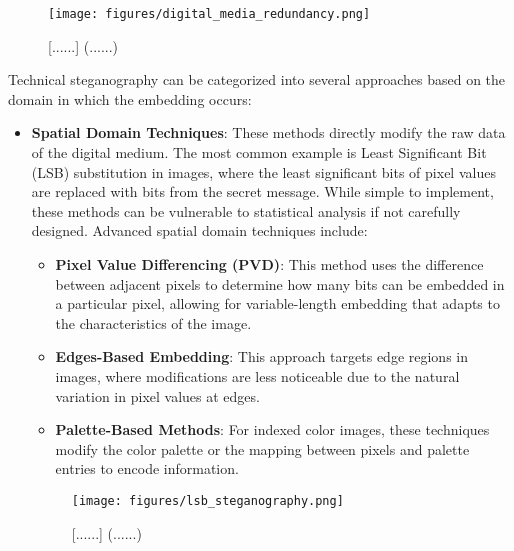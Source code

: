 \documentclass[12pt, a4paper, oneside]{book}
\begin{document}
\begin{figure}[htbp]
    \centering
    \texttt{[image: figures/digital\_media\_redundancy.png]}
    \caption{[......] (......)}
    \label{fig:digital_redundancy}
\end{figure}

Technical steganography can be categorized into several approaches based on the domain in which the embedding occurs:

\begin{itemize}[leftmargin=*]
    \item \textbf{Spatial Domain Techniques}: These methods directly modify the raw data of the digital medium. The most common example is Least Significant Bit (LSB) substitution in images, where the least significant bits of pixel values are replaced with bits from the secret message. While simple to implement, these methods can be vulnerable to statistical analysis if not carefully designed. Advanced spatial domain techniques include:
    \begin{itemize}
        \item \textbf{Pixel Value Differencing (PVD)}: This method uses the difference between adjacent pixels to determine how many bits can be embedded in a particular pixel, allowing for variable-length embedding that adapts to the characteristics of the image.
        \item \textbf{Edges-Based Embedding}: This approach targets edge regions in images, where modifications are less noticeable due to the natural variation in pixel values at edges.
        \item \textbf{Palette-Based Methods}: For indexed color images, these techniques modify the color palette or the mapping between pixels and palette entries to encode information.
    \end{itemize}

    \begin{figure}[htbp]
        \centering
        \texttt{[image: figures/lsb\_steganography.png]}
        \caption{[......] (......)}
        \label{fig:lsb_steganography}
    \end{figure}


\end{itemize}
\end{document}
